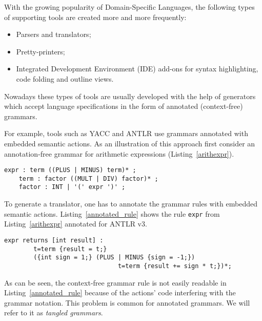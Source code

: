 \documentclass{IOS-Book-Article}     %
\newcommand{\bad}[1]{\textcolor{red}{#1}}
\renewcommand{\bad}[1]{#1}
\newcommand{\lstref}[1]{Listing~\ref{#1}}
\newcommand{\tool}[1]{\textsc{#1}}
\begin{document}
With the growing popularity of Domain-Specific Languages, the following types of supporting tools are created \bad{more and} more frequently:
\begin{itemize}
	\item Parsers and translators;
	\item Pretty-printers;
	\item Integrated Development Environment (IDE) add-ons for syntax highlighting, code folding and outline views.
\end{itemize}

Nowadays these types of tools are usually developed with the help of generators which accept language specifications in the form of annotated (context-free) grammars. 

For example, tools such as \tool{YACC} \cite{YACC} and \tool{ANTLR} \cite{ANTLR} use grammars annotated with embedded semantic actions. As an illustration of this approach first consider an annotation-free grammar for arithmetic expressions (\lstref{arithexpr}).
\begin{lstlisting}[language=Grammatic,label=arithexpr,caption=Grammar for arithmetic expressions,float]
    expr : term ((PLUS | MINUS) term)* ;
    term : factor ((MULT | DIV) factor)* ;
    factor : INT | '(' expr ')' ;
\end{lstlisting}
To generate a translator, one has to annotate the grammar rules with embedded semantic actions. \lstref{annotated_rule} shows the rule \texttt{expr} from \lstref{arithexpr} annotated for \tool{ANTLR} v3.
\begin{lstlisting}[caption=Annotated grammar rule,label=annotated_rule,float]
    expr returns [int result] : 
        t=term {result = t;} 
        ({int sign = 1;} (PLUS | MINUS {sign = -1;}) 
                               t=term {result += sign * t;})*;
\end{lstlisting}

As can be seen, the context-free grammar rule is not easily readable in \lstref{annotated_rule} because of the actions' code interfering with the grammar notation. This problem is common for annotated grammars. We will refer to it as \emph{tangled grammars}.
\end{document}
